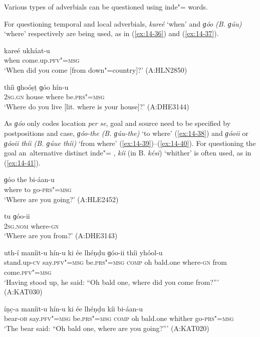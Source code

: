  Various types of adverbials can be questioned using inde"= words.


For questioning temporal and local adverbials, \textit{kareé} `when' and \textit{ɡóo} \textit{(B. ɡúu)} `where' respectively are being used, as in (\ref{ex:14-36}) and (\ref{ex:14-37}). 

\begin{exe}
\ex
\label{ex:14-36}
\gll kareé ukháat-u \\
when come.up.\textsc{pfv"=msg} \\
\glt `When did you come [from down"=country]?' (A:HLN2850)

\ex
\label{ex:14-37}
\gll thíi ɡhoóṣṭ ɡóo hín-u \\
\textsc{2sg.gn} house where be.\textsc{prs"=msg} \\
\glt `Where do you live [lit. where is your house]?' (A:DHE3144)
\end{exe}

As \textit{ɡóo} only codes location \textit{per se}, goal and source need to be specified by postpositions and case, \textit{ɡóo-the (B. ɡúu-the)} `to where' (\ref{ex:14-38}) and \textit{ɡóoii} or \textit{ɡóoii thíi (B. ɡúue thíi)} `from where' (\ref{ex:14-39})--(\ref{ex:14-40}). For questioning the goal an~alternative distinct inde"= , \textit{kíi} (in B. \textit{kési}) `whither' is often used, as in (\ref{ex:14-41}).

\begin{exe}
\ex
\label{ex:14-38}
\gll ɡóo the bi-áan-u \\
where to go-\textsc{prs"=msg } \\
\glt `Where are you going?' (A:HLE2452)

\ex
\label{ex:14-39}
\gll tu ɡóo-ii \\
\textsc{2sg.nom} where-\textsc{gn}  \\
\glt `Where are you from?' (A:DHE3143)

\ex
\label{ex:14-40}
\gll uth-í maníit-u hín-u ki ée  lhéṇḍu ɡóo-ii thíi yhóol-u \\
stand.up-\textsc{cv} say.\textsc{pfv"=msg} be.\textsc{prs"=msg} \textsc{comp} oh bald.one where-\textsc{gn} from come.\textsc{pfv"=msg} \\
\glt `Having stood up, he said: ``Oh bald one, where did you come from?''' (A:KAT030)

\ex
\label{ex:14-41}
\gll íṇc̣-a maníit-u hín-u ki ée lhéṇḍu  kíi bi-áan-u \\
bear-\textsc{ob} say.\textsc{pfv"=msg} be.\textsc{prs"=msg} \textsc{comp} oh bald.one whither go-\textsc{prs"=msg} \\
\glt `The bear said: ``Oh bald one, where are you going?''' (A:KAT020)
\end{exe}

